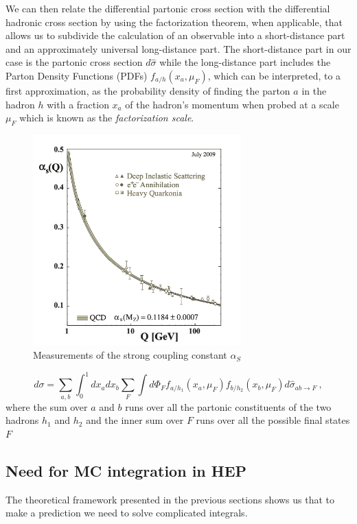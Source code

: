 \documentclass[../main/main.tex]{subfiles}
\begin{document}
We can then relate the differential partonic cross section with the differential hadronic cross section by using the factorization theorem, when 
applicable, that allows us to subdivide the calculation of an observable into a short-distance part and an approximately universal long-distance part.
The short-distance part in our case is the partonic cross section $d\hat{\sigma}$  while the long-distance part includes the Parton Density Functions (PDFs) $f_{a/h}(x_a,\mu_F)$, which can be interpreted, to a first approximation,  as the probability density of finding the parton $a$ in the hadron $h$ with a 
fraction $x_a$ of the hadron's  momentum when probed at a scale $\mu_F$ which is known as the \emph{factorization scale}.
\begin{figure}[h]
	\centering
	\includegraphics[width=8cm]{../images/asymptotic_freedom.png}
	\caption{Measurements of the strong coupling constant $\alpha_S$}
	\label{alpha}
\end{figure}
\begin{equation}
	\label{QCD fact}
	d\sigma = \sum_{a,b}\int_0^1 dx_a dx_b \sum_F \int d\Phi_F f_{a/h_1}(x_a,\mu_F) f_{b/h_2}(x_b,\mu_F)  d\hat{\sigma}_{ab \rightarrow F} \ ,
\end{equation}
where the sum over $a$ and $b$ runs over all the partonic constituents of the two hadrons $h_1$ and $h_2$ and the inner sum over $F$ runs over all the possible final states $F$

\subsection{Need for MC integration in HEP}
The theoretical framework presented in the previous sections shows us that to make a prediction we need to solve complicated integrals. 
\end{document}
